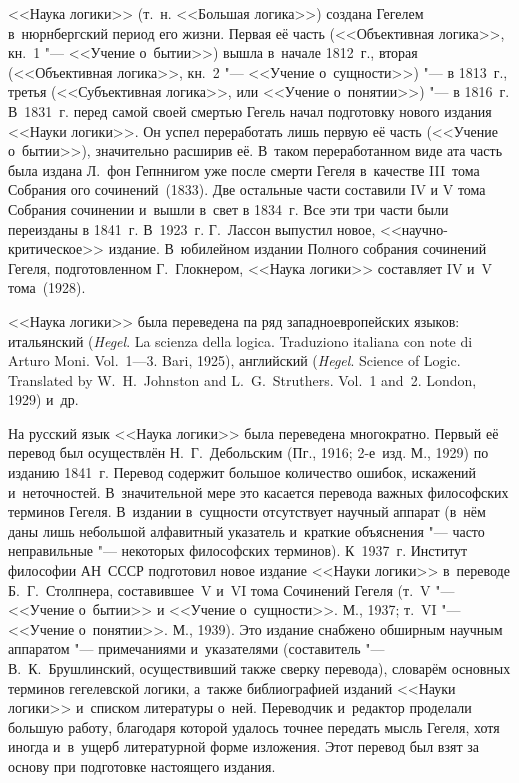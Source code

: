 <<Наука логики>> (т.~н. <<Большая логика>>) создана Гегелем в~нюрнбергский
период его жизни. Первая её часть (<<Объективная логика>>, кн.~1 "--- <<Учение
о~бытии>>) вышла в~начале 1812~г., вторая (<<Объективная логика>>, кн.~2 "---
<<Учение о~сущности>>) "--- в 1813~г., третья (<<Субъективная логика>>, или
<<Учение о~понятии>>) "--- в 1816~г. В~1831~г. перед самой своей смертью Гегель
начал подготовку нового издания <<Науки логики>>. Он успел переработать лишь
первую её часть (<<Учение о~бытии>>), значительно расширив её. В~таком
переработанном виде ата часть была издана Л.~фон Гепннигом уже после смерти
Гегеля в~качестве III~тома Собрания ого сочинений~(1833). Две остальные части
составили IV и V тома Собрания сочинении и~вышли в~свет в 1834~г. Все эти три
части были переизданы в 1841~г. В~1923~г. Г.~Лассон выпустил новое,
<<научно-критическое>> издание. В~юбилейном издании Полного собрания сочинений
Гегеля, подготовленном Г.~Глокнером, <<Наука логики>>
составляет IV и~V тома~(1928).

<<Наука логики>> была переведена па ряд западноевропейских языков: итальянский
({\em Hegel}. La scienza della logica. Traduziono italiana con note di Arturo
Moni. Vol.~1---3. Bari, 1925), английский ({\em Hegel}. Science of Logic.
Translated by W.~H.~Johnston and L.~G.~Struthers. Vol.~1 and~2. London, 1929)
и~др.

На русский язык <<Наука логики>> была переведена многократно. Первый её перевод
был осуществлён Н.~Г.~Дебольским (Пг., 1916; 2-е~изд. М., 1929) по изданию
1841~г. Перевод содержит большое количество ошибок, искажений и~неточностей.
В~значительной мере это касается перевода важных философских терминов Гегеля.
В~издании в~сущности отсутствует научный аппарат (в~нём даны лишь небольшой
алфавитный указатель и~краткие объяснения "--- часто неправильные "---
некоторых философских терминов). К~1937~г. Институт философии АН~СССР
подготовил новое издание <<Науки логики>> в~переводе Б.~Г.~Столпнера,
составившее~V и~VI тома Сочинений Гегеля (т.~V "--- <<Учение о~бытии>> и
<<Учение о~сущности>>. М., 1937; т.~VI "--- <<Учение о~понятии>>. М., 1939).
Это издание снабжено обширным научным аппаратом "--- примечаниями и~указателями
(составитель "--- В.~К.~Брушлинский, осуществивший также сверку перевода),
словарём основных терминов гегелевской логики, а~также библиографией изданий
<<Науки логики>> и~списком литературы о~ней. Переводчик и~редактор проделали
большую работу, благодаря которой удалось точнее передать мысль Гегеля, хотя
иногда и~в~ущерб литературной форме изложения. Этот перевод был взят за основу
при подготовке настоящего издания.

\bigskip

\begin{center}
~~~~~~
\end{center}

\bigskip
